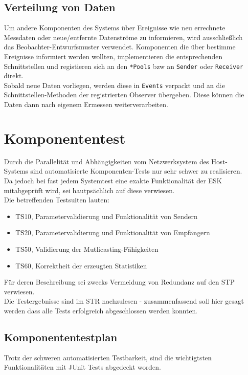 \section{Verteilung von Daten}
Um andere Komponenten des Systems über Ereignisse wie neu errechnete Messdaten
oder neue/entfernte Datenströme zu informieren, wird ausschließlich das
Beobachter-Entwurfsmuster verwendet. Komponenten die über bestimme Ereignisse
informiert werden wollten, implementieren die entsprechenden Schnittstellen und
registieren sich an den \texttt{*Pools} bzw an \texttt{Sender} oder
\texttt{Receiver} direkt.\\
Sobald neue Daten vorliegen, werden diese in \texttt{Events} verpackt und an die
Schnittstellen-Methoden der registrierten Observer übergeben. Diese können die
Daten dann nach eigenem Ermessen weiterverarbeiten.


\chapter{Komponententest}
Durch die Parallelität und Abhängigkeiten vom Netzwerksystem des
Host-Systems sind automatisierte Komponenten-Tests nur sehr schwer zu
realisieren. Da jedoch bei fast jedem Systemtest eine exakte Funktionalität der
ESK mitabgeprüft wird, sei hautpsächlich auf diese verwiesen.\\[1cm]

Die betreffenden Testsuiten lauten:
\begin{itemize}
  \item TS10, Parametervalidierung und Funktionalität von Sendern
  \item TS20, Parametervalidierung und Funktionalität von Empfängern
  \item TS50, Validierung der Mutlicasting-Fähigkeiten
  \item TS60, Korrektheit der erzeugten Statistiken
\end{itemize}
Für deren Beschreibung sei zwecks Vermeidung von Redundanz auf den STP
verwiesen.\\
Die Testergebnisse sind im STR nachzulesen - zusammenfassend soll hier gesagt
werden dass alle Tests erfolgreich abgeschlossen werden konnten.

\section{Komponententestplan}
Trotz der schweren automatisierten Testbarkeit, sind die wichtigtsten
Funktionalitäten mit JUnit Tests abgedeckt worden.

